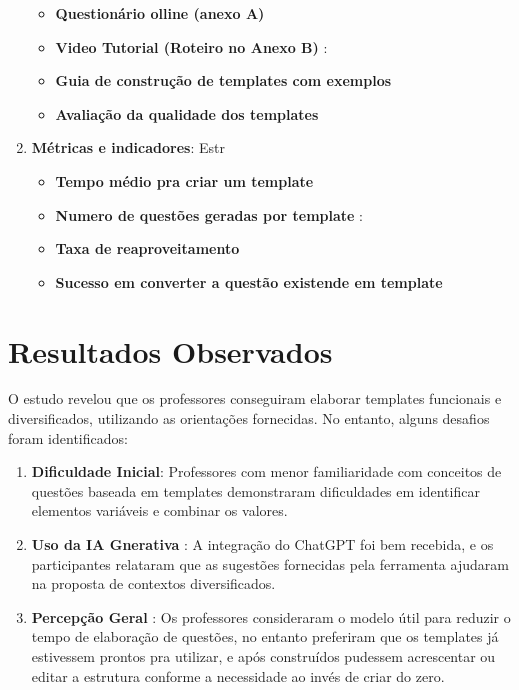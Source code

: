 \begin{enumerate}
    
    \begin{itemize}
        \item \textbf{Questionário olline (anexo A)} 
        \item \textbf{Video Tutorial (Roteiro no Anexo B)} :
        \item \textbf{Guia de construção de templates com exemplos} 
        \item  \textbf{Avaliação da qualidade dos templates} 
    \end{itemize}



    \item \textbf{Métricas e indicadores}:  Estr
    \begin{itemize}
        \item \textbf{Tempo médio pra criar um template} 
        \item \textbf{Numero de questões geradas por template} :
        \item \textbf{Taxa de reaproveitamento} 
        \item  \textbf{Sucesso em converter a questão existende em template} 
    \end{itemize}

    
\end{enumerate}






\section{Resultados Observados}

O estudo revelou que os professores conseguiram elaborar templates funcionais e diversificados, utilizando as orientações fornecidas. No entanto, alguns desafios foram identificados:

\begin{enumerate}
    \item \textbf{Dificuldade Inicial}: Professores com menor familiaridade com conceitos de questões baseada em templates demonstraram dificuldades em identificar elementos variáveis e combinar os valores.
    \item \textbf{Uso da IA Gnerativa} : A integração do ChatGPT foi bem recebida, e os participantes relataram que as sugestões fornecidas pela ferramenta ajudaram na proposta de contextos diversificados.
    \item \textbf{Percepção Geral} : Os professores consideraram o modelo útil para reduzir o tempo de elaboração de questões, no entanto preferiram que os templates já estivessem prontos pra utilizar, e após construídos pudessem acrescentar ou editar a estrutura conforme a necessidade ao invés de criar do zero.
\end{enumerate}


